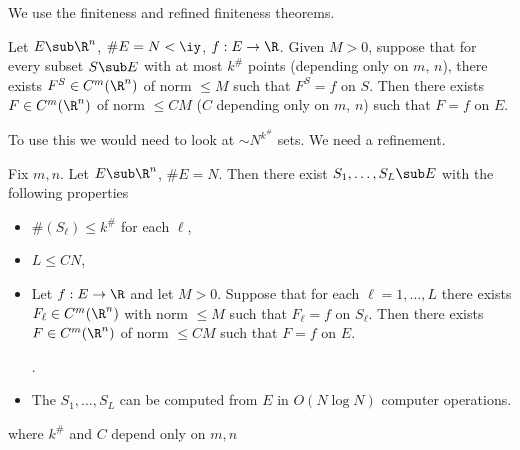 We use the finiteness and refined finiteness theorems.
\begin{thm}\label{thm:fin}
Let $E\sub \R^n$, $\#E=N<\iy$, $f:E\to \R$. Given $M>0$, suppose that for every subset $S\sub E$ with at most $k^\#$ points (depending only on $m$, $n$), there exists $F^S\in C^m(\R^n)$ of norm $\le M$ such that $F^S=f$ on $S$. Then there exists $F\in C^m(\R^n)$ of norm $\le C M$ ($C$ depending only on $m$, $n$) such that $F=f$ on $E$.
\end{thm}
To use this we would need to look at $\sim N^{k^\#}$ sets.  %
We need a refinement. 

\begin{thm}\label{thm:rft}
Fix $m,n$. Let $E\sub \R^n$, $\#E = N$. Then there exist $S_1,\ldots ,S_L\sub E$ with the following properties
\begin{itemize}
\item
$\#(S_\ell)\le k^\#$ for each $\ell$,
\item
$L\le CN$, 
\item
Let $f:E\to \R$ and let $M>0$. Suppose that for each $\ell=1,\ldots, L$ there exists $F_\ell\in C^m(\R^n)$ with norm $\le M$ such that $F_\ell=f$ on $S_\ell$. Then there exists $F\in C^m(\R^n)$ of norm $\le CM$ such that $F=f$ on $E$.
 
.
\item
The $S_1,\ldots, S_L$ can be computed from $E$ in $O(N\log N)$ computer operations.
\end{itemize}
where $k^\#$ and $C$ depend only on $m,n$
\end{thm}

